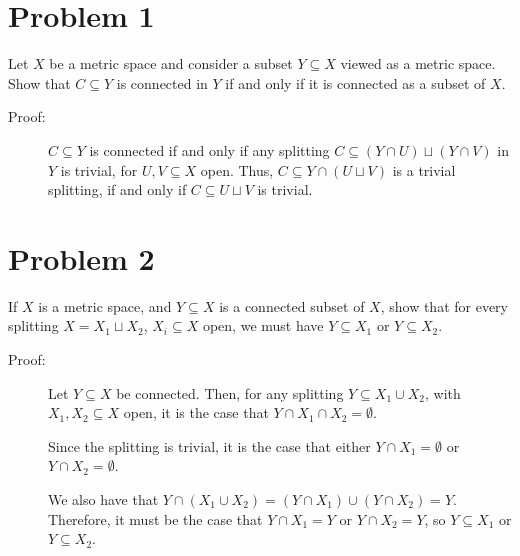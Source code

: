 \documentclass[10pt]{extarticle}
\title{}
\author{}
\date{}
\begin{document}
  \section{Problem 1}%
  Let $X$ be a metric space and consider a subset $Y\subseteq X$ viewed as a metric space. Show that $C\subseteq Y$ is connected in $Y$ if and only if it is connected as a subset of $X$.
  \begin{description}
    \item[Proof:] $C\subseteq Y$ is connected if and only if any splitting $C\subseteq (Y\cap U)\sqcup(Y\cap V)$ in $Y$ is trivial, for $U,V\subseteq X$ open. Thus, $C\subseteq Y\cap (U\sqcup V)$ is a trivial splitting, if and only if $C\subseteq U\sqcup V$ is trivial.
  \end{description}
  \section{Problem 2}%
  If $X$ is a metric space, and $Y\subseteq X$ is a connected subset of $X$, show that for every splitting $X = X_1\sqcup X_2$, $X_i\subseteq X$ open, we must have $Y\subseteq X_1$ or $Y\subseteq X_2$.
  \begin{description}
    \item[Proof:] Let $Y\subseteq X$ be connected. Then, for any splitting $Y\subseteq X_1\cup X_2$, with $X_1,X_2\subseteq X$ open, it is the case that $Y\cap X_1\cap X_2 = \emptyset$.

      Since the splitting is trivial, it is the case that either $Y\cap X_1 = \emptyset$ or $Y\cap X_2 = \emptyset$.

      We also have that $Y\cap (X_1 \cup X_2) = \left(Y\cap X_1\right) \cup \left(Y\cap X_2\right) = Y$. Therefore, it must be the case that $Y\cap X_1 = Y$ or $Y\cap X_2 = Y$, so $Y\subseteq X_1$ or $Y\subseteq X_2$.
  \end{description}
\end{document}
